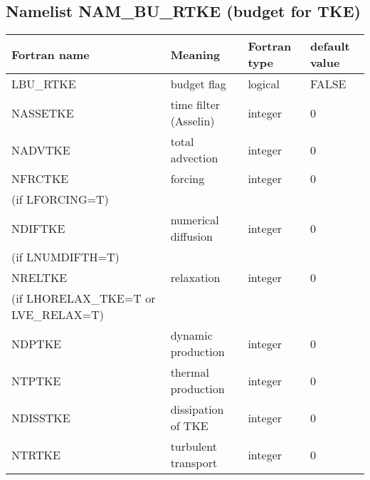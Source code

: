 \subsection{Namelist NAM\_BU\_RTKE (budget for TKE)}

\begin{center}
\begin{tabular} {|p{8cm}|p{4cm}|>{\centering}p{1.5cm}|p{1.5cm}<{\centering}|}
\hline
Fortran name & Meaning & Fortran type & default value \\
\hline\hline
LBU\_RTKE & budget flag & logical & FALSE\index{LBU\_RTKE!\innam{NAM\_BU\_RTKE}} \\\hline
NASSETKE  & time filter (Asselin)   & integer  &  0 \index{NASSETKE!\innam{NAM\_BU\_RTKE}} \\\hline
NADVTKE   & total advection   & integer  &  0 \index{NADVTKE!\innam{NAM\_BU\_RTKE}}\\\hline
NFRCTKE   & forcing           & integer  &  0 \index{NFRCTKE!\innam{NAM\_BU\_RTKE}} \\
(if LFORCING=T) &  &   &   \\\hline
NDIFTKE   & numerical diffusion & integer  &  0 \index{NDIFTKE!\innam{NAM\_BU\_RTKE}}\\
(if LNUMDIFTH=T) &  &   &   \\\hline
NRELTKE   & relaxation        & integer  &  0 \index{NRELTKE!\innam{NAM\_BU\_RTKE}}\\
(if LHORELAX\_TKE=T or LVE\_RELAX=T) &  &   &   \\\hline
NDPTKE    & dynamic production & integer  &  0 \index{NDPTKE!\innam{NAM\_BU\_RTKE}}\\\hline
NTPTKE    & thermal production & integer  &  0 \index{NTPTKE!\innam{NAM\_BU\_RTKE}}\\\hline
NDISSTKE  & dissipation of TKE & integer  &  0 \index{NDISSTKE!\innam{NAM\_BU\_RTKE}}\\\hline
NTRTKE    & turbulent transport &  integer  &  0 \index{NTRTKE!\innam{NAM\_BU\_RTKE}} \\\hline
\end{tabular}
\end{center}
